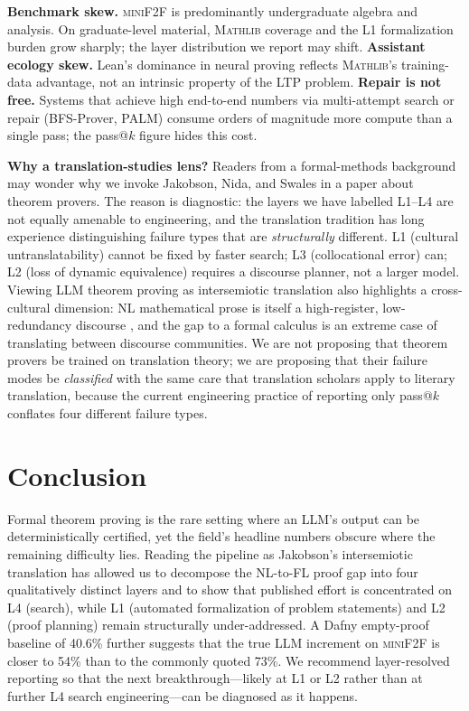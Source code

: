 \documentclass[11pt,letterpaper]{article}
\begin{document}
\textbf{Benchmark skew.} \textsc{miniF2F} is predominantly
undergraduate algebra and analysis. On graduate-level material,
\textsc{Mathlib} coverage and the L1 formalization burden grow
sharply; the layer distribution we report may shift. \textbf{Assistant
ecology skew.} Lean's dominance in neural proving reflects
\textsc{Mathlib}'s training-data advantage, not an intrinsic
property of the LTP problem. \textbf{Repair is not free.} Systems
that achieve high end-to-end numbers via multi-attempt search or
repair (BFS-Prover, PALM) consume orders of magnitude more compute
than a single pass; the pass@$k$ figure hides this cost.

\textbf{Why a translation-studies lens?}
Readers from a formal-methods background may wonder why we invoke
Jakobson, Nida, and Swales in a paper about theorem provers. The reason
is diagnostic: the layers we have labelled L1--L4 are not equally
amenable to engineering, and the translation tradition has long
experience distinguishing failure types that are \emph{structurally}
different. L1 (cultural untranslatability) cannot be fixed by faster
search; L3 (collocational error) can; L2 (loss of dynamic equivalence)
requires a discourse planner, not a larger model. Viewing LLM theorem
proving as intersemiotic translation \cite{jakobson1959translation} also
highlights a cross-cultural dimension: NL mathematical prose is itself
a high-register, low-redundancy discourse
\cite{swales1990genre,hall1976culture}, and the gap to a formal
calculus is an extreme case of translating between discourse
communities. We are not proposing that theorem provers be trained on
translation theory; we are proposing that their failure modes be
\emph{classified} with the same care that translation scholars apply to
literary translation, because the current engineering practice of
reporting only pass@$k$ conflates four different failure types.

\section{Conclusion}
\label{sec:conclusion}

Formal theorem proving is the rare setting where an LLM's output can
be deterministically certified, yet the field's headline numbers
obscure where the remaining difficulty lies. Reading the pipeline as
Jakobson's intersemiotic translation \cite{jakobson1959translation}
has allowed us to decompose the NL-to-FL proof gap into four
qualitatively distinct layers and to show that published effort is
concentrated on L4 (search), while L1 (automated formalization of
problem statements) and L2 (proof planning) remain structurally
under-addressed. A Dafny empty-proof baseline of 40.6\% further
suggests that the true LLM increment on \textsc{miniF2F} is closer to
54\% than to the commonly quoted 73\%. We recommend layer-resolved
reporting so that the next breakthrough---likely at L1 or L2 rather
than at further L4 search engineering---can be diagnosed as it happens.

\vspace{1em}

\end{document}
